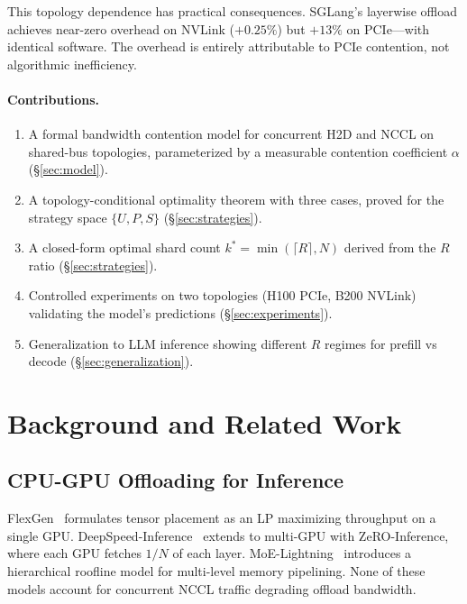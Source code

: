 \documentclass{article}
\begin{document}
This topology dependence has practical consequences. SGLang's layerwise offload achieves near-zero overhead on NVLink ($+0.25\%$) but $+13\%$ on PCIe---with identical software. The overhead is entirely attributable to PCIe contention, not algorithmic inefficiency.

\paragraph{Contributions.}
\begin{enumerate}
    \item A formal bandwidth contention model for concurrent H2D and NCCL on shared-bus topologies, parameterized by a measurable contention coefficient $\alpha$ (\S\ref{sec:model}).
    \item A topology-conditional optimality theorem with three cases, proved for the strategy space $\{U, P, S\}$ (\S\ref{sec:strategies}).
    \item A closed-form optimal shard count $k^* = \min(\lceil R \rceil, N)$ derived from the $R$ ratio (\S\ref{sec:strategies}).
    \item Controlled experiments on two topologies (H100 PCIe, B200 NVLink) validating the model's predictions (\S\ref{sec:experiments}).
    \item Generalization to LLM inference showing different $R$ regimes for prefill vs decode (\S\ref{sec:generalization}).
\end{enumerate}

\section{Background and Related Work}
\label{sec:related}

\subsection{CPU-GPU Offloading for Inference}

FlexGen~\citep{flexgen} formulates tensor placement as an LP maximizing throughput on a single GPU. DeepSpeed-Inference~\citep{deepspeed-inference} extends to multi-GPU with ZeRO-Inference, where each GPU fetches $1/N$ of each layer. MoE-Lightning~\citep{moe-lightning} introduces a hierarchical roofline model for multi-level memory pipelining. None of these models account for concurrent NCCL traffic degrading offload bandwidth.
\end{document}
